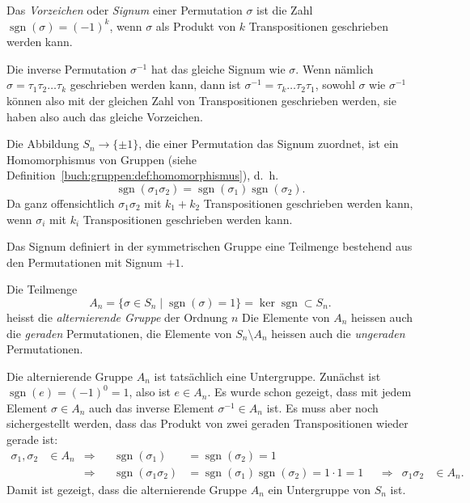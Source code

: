 \begin{definition}
%
%
Das {\em Vorzeichen} oder {\em Signum} einer Permutation $\sigma$ ist
die Zahl $\operatorname{sgn}(\sigma)=(-1)^k$, wenn $\sigma$ als Produkt
von $k$ Transpositionen geschrieben werden kann.
\end{definition}

Die inverse Permutation $\sigma^{-1}$ hat das gleiche Signum wie $\sigma$.
Wenn nämlich $\sigma= \tau_1\tau_2\dots\tau_k$ geschrieben werden kann,
dann ist $\sigma^{-1}=\tau_k\dots\tau_2\tau_1$, sowohl $\sigma$ wie
$\sigma^{-1}$ können also mit der gleichen Zahl von Transpositionen
geschrieben werden, sie haben also auch das gleiche Vorzeichen.

Die Abbildung $S_n\to\{\pm1\}$, die einer Permutation das Signum zuordnet,
ist ein Homomorphismus von Gruppen
(siehe Definition~\ref{buch:gruppen:def:homomorphismus}),
%
d.~h.
\[
\operatorname{sgn}(\sigma_1\sigma_2)
=
\operatorname{sgn}(\sigma_1)
\operatorname{sgn}(\sigma_2).
\]
Da ganz offensichtlich $\sigma_1\sigma_2$ mit $k_1+k_2$ Transpositionen
geschrieben werden kann, wenn $\sigma_i$ mit $k_i$ Transpositionen geschrieben
werden kann.

Das Signum definiert in der symmetrischen Gruppe eine Teilmenge bestehend
aus den Permutationen mit Signum $+1$.

\begin{definition}
Die Teilmenge
\[
A_n
=
\{
\sigma\in S_n\;|\; \operatorname{sgn}(\sigma)=1
\}
=
\ker \operatorname{sgn}
\subset
S_n.
\]
%
%
heisst die {\em alternierende Gruppe} der Ordnung $n$
Die Elemente von $A_n$ heissen auch die {\em geraden} Permutationen,
%
%
die
Elemente von $S_n\setminus A_n$ heissen auch die {\em ungeraden}
Permutationen.
\end{definition}

Die alternierende Gruppe $A_n$ ist tatsächlich eine Untergruppe.
%
Zunächst ist $\operatorname{sgn}(e)=(-1)^0=1$, also ist $e\in A_n$.
Es wurde schon gezeigt, dass mit jedem Element $\sigma\in A_n$ auch
das inverse Element $\sigma^{-1}\in A_n$ ist.
Es muss aber noch sichergestellt werden, dass das Produkt von zwei
geraden Transpositionen wieder gerade ist:
\[
\begin{aligned}
\sigma_1,\sigma_2&\in A_n
&\Rightarrow&&
\operatorname{sgn}(\sigma_1)
&=
\operatorname{sgn}(\sigma_2)
=
1
\\
&&\Rightarrow&&
\operatorname{sgn}(\sigma_1\sigma_2)
&=
\operatorname{sgn}(\sigma_1)
\operatorname{sgn}(\sigma_2)
=
1\cdot 1=1
&&\Rightarrow&
\sigma_1\sigma_2&\in A_n.
\end{aligned}
\]
Damit ist gezeigt, dass die alternierende Gruppe $A_n$ ein Untergruppe von 
$S_n$ ist.

